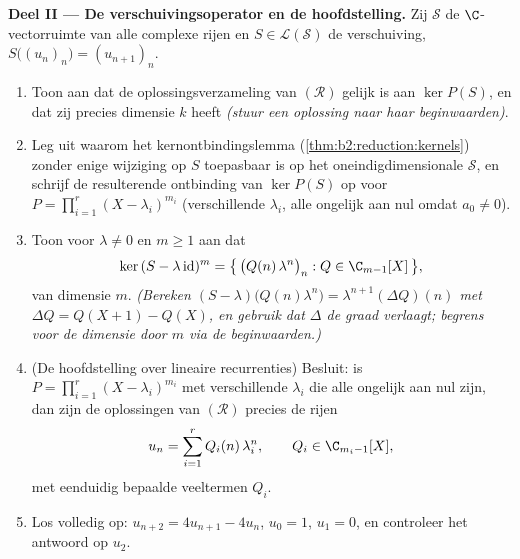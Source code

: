 \begin{problem}
\medskip
\noindent\textbf{Deel II --- De verschuivingsoperator en de
hoofdstelling.} Zij $\mathcal{S}$ de $\C$-vectorruimte van alle
complexe rijen en $S \in \mathcal{L}(\mathcal{S})$ de
verschuiving, $S\bigl((u_n)_n\bigr) = (u_{n+1})_n$.
\begin{enumerate}[resume]
  \item Toon aan dat de oplossingsverzameling van $(\mathcal R)$
        gelijk is aan $\ker P(S)$, en dat zij precies dimensie $k$
        heeft \emph{(stuur een oplossing naar haar
        beginwaarden)}.
  \item Leg uit waarom het kernontbindingslemma
        (\cref{thm:b2:reduction:kernels}) zonder enige wijziging
        op $S$ toepasbaar is op het oneindigdimensionale
        $\mathcal{S}$, en schrijf de resulterende ontbinding van
        $\ker P(S)$ op voor $P = \prod_{i=1}^{r}(X -
        \lambda_i)^{m_i}$ (verschillende $\lambda_i$, alle
        ongelijk aan nul omdat $a_0 \neq 0$).
  \item Toon voor $\lambda \neq 0$ en $m \geq 1$ aan dat
        \[
        \ker\,(S - \lambda\,\mathrm{id})^m
        = \bigl\{\,\bigl(Q(n)\,\lambda^n\bigr)_n : Q \in
        \C_{m-1}[X]\,\bigr\},
        \]
        van dimensie $m$. \emph{(Bereken $(S -
        \lambda)\bigl(Q(n)\lambda^n\bigr) =
        \lambda^{n+1}(\Delta Q)(n)$ met $\Delta Q = Q(X + 1) -
        Q(X)$, en gebruik dat $\Delta$ de graad verlaagt; begrens
        voor de dimensie door $m$ via de beginwaarden.)}
  \item (De hoofdstelling over lineaire recurrenties) Besluit: is
        $P = \prod_{i=1}^{r}(X - \lambda_i)^{m_i}$ met
        verschillende $\lambda_i$ die alle ongelijk aan nul zijn,
        dan zijn de oplossingen van $(\mathcal R)$ precies de
        rijen
        \[
        u_n = \sum_{i=1}^{r} Q_i(n)\,\lambda_i^n,
        \qquad Q_i \in \C_{m_i - 1}[X],
        \]
        met eenduidig bepaalde veeltermen $Q_i$.
  \item Los volledig op: $u_{n+2} = 4u_{n+1} - 4u_n$, $u_0 = 1$,
        $u_1 = 0$, en controleer het antwoord op $u_2$.
\end{enumerate}


\end{problem}
